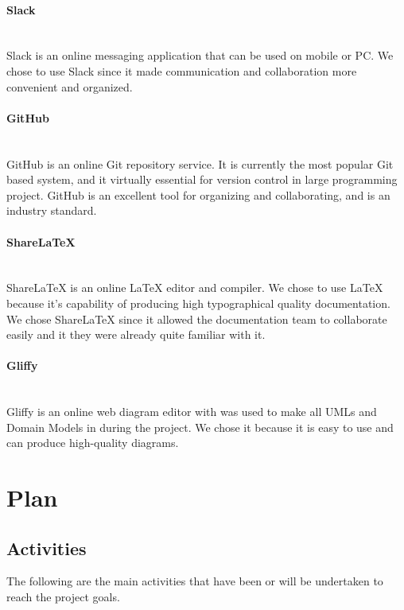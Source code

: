 \documentclass[12pt]{article}
\begin{document}
\paragraph*{Slack}~\\
Slack is an online messaging application that can be used on mobile or PC. We chose to use Slack since it made communication and collaboration more convenient and organized.
%
\paragraph*{GitHub}~\\
GitHub is an online Git repository service. It is currently the most popular Git based system, and it virtually essential for version control in large programming project. GitHub is an excellent tool for organizing and collaborating, and is an industry standard.
%
\paragraph*{ShareLaTeX}~\\
ShareLaTeX is an online LaTeX editor and compiler. We chose to use LaTeX because it's capability of producing high typographical quality documentation. We chose ShareLaTeX since it allowed the documentation team to collaborate easily and it they were already quite familiar with it. 
%
\paragraph*{Gliffy}~\\
Gliffy is an online web diagram editor with was used to make all UMLs and Domain Models in during the project. We chose it because it is easy to use and can produce high-quality diagrams.
%
\vfill
\newpage
\section{Plan}
\subsection{Activities}
The following are the main activities that have been or will be undertaken to reach
the project goals.
\end{document}

